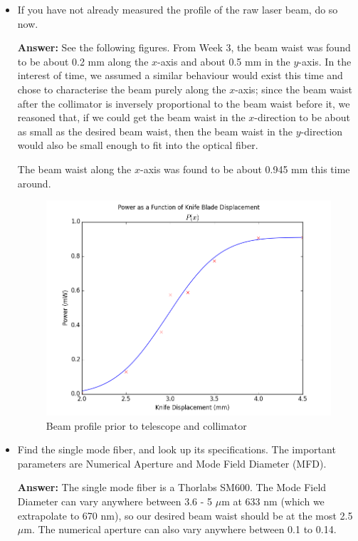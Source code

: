 \documentclass[10pt,a4paper]{article}
\begin{document}
\begin{itemize}
\item If you have not already measured the profile of the raw laser beam, do so now.

\textbf{Answer: } See the following figures. From Week 3, the beam waist was found to be about 0.2 mm along the $x$-axis and about 0.5 mm in the $y$-axis. In the interest of time, we assumed a similar behaviour would exist this time and chose to characterise the beam purely along the $x$-axis; since the beam waist after the collimator is inversely proportional to the beam waist before it, we reasoned that, if we could get the beam waist in the $x$-direction to be about as small as the desired beam waist, then the beam waist in the $y$-direction would also be small enough to fit into the optical fiber. 

The beam waist along the $x$-axis was found to be about 0.945 mm this time around. 

\begin{figure}[H]
\centering
\includegraphics[scale = 0.5]{../Analysis/beam_profile_init.png}
\caption{Beam profile prior to telescope and collimator}
\end{figure}

\item Find the single mode fiber, and look up its specifications. The important parameters are Numerical Aperture and Mode Field Diameter (MFD).

\textbf{Answer: }The single mode fiber is a Thorlabs SM600. The Mode Field Diameter can vary anywhere between 3.6 - 5 $\mu$m at 633 nm (which we extrapolate to 670 nm), so our desired beam waist should be at the most 2.5 $\mu$m. The numerical aperture can also vary anywhere between 0.1 to 0.14. 


\end{itemize}
\end{document}
